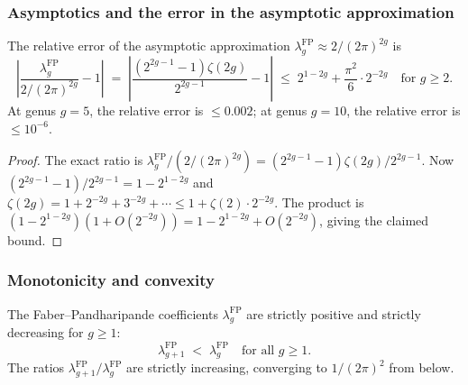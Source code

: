 \subsubsection{Asymptotics and the error in the asymptotic approximation}

\begin{proposition}
The relative error of the asymptotic approximation $\lambda_g^{\mathrm{FP}} \approx 2/(2\pi)^{2g}$ is
\begin{equation}%
\left|\frac{\lambda_g^{\mathrm{FP}}}{2/(2\pi)^{2g}} - 1\right| \;=\; \left|\frac{(2^{2g-1}-1)\zeta(2g)}{2^{2g-1}} - 1\right| \;\leq\; 2^{1-2g} + \frac{\pi^2}{6} \cdot 2^{-2g} \quad\text{for } g \geq 2.
\end{equation}
At genus $g = 5$, the relative error is $\leq 0.002$; at genus $g = 10$, the relative error is $\leq 10^{-6}$.
\end{proposition}

\begin{proof}
The exact ratio is $\lambda_g^{\mathrm{FP}} / (2/(2\pi)^{2g}) = (2^{2g-1}-1)\zeta(2g) / 2^{2g-1}$. Now $(2^{2g-1}-1)/2^{2g-1} = 1 - 2^{1-2g}$ and $\zeta(2g) = 1 + 2^{-2g} + 3^{-2g} + \cdots \leq 1 + \zeta(2) \cdot 2^{-2g}$. The product is $(1-2^{1-2g})(1 + O(2^{-2g})) = 1 - 2^{1-2g} + O(2^{-2g})$, giving the claimed bound.
\end{proof}

\subsubsection{Monotonicity and convexity}

\begin{proposition}
The Faber--Pandharipande coefficients $\lambda_g^{\mathrm{FP}}$ are strictly positive and strictly decreasing for $g \geq 1$:
\begin{equation}%
\lambda_{g+1}^{\mathrm{FP}} \;<\; \lambda_g^{\mathrm{FP}} \quad\text{for all } g \geq 1.
\end{equation}
The ratios $\lambda_{g+1}^{\mathrm{FP}}/\lambda_g^{\mathrm{FP}}$ are strictly increasing, converging to $1/(2\pi)^2$ from below.
\end{proposition}

